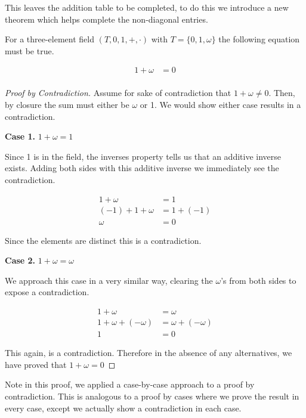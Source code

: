 \documentclass{report}
\newcommand{\header}[2]{\begin{flushright} \textbf{#1} #2 \end{flushright}}
\begin{document}
This leaves the addition table to be completed, to do this we introduce a new theorem which helps complete the non-diagonal entries.

\vspace{\baselineskip}
\begin{theorem}
	For a three-element field $(T, 0, 1, +, \cdot)$ with $T = \{ 0, 1, \omega \}$ the following equation must be true.
	
	\begin{align*}
		1 + \omega &= 0 \\
	\end{align*}
\end{theorem}

\begin{proof}[Proof by Contradiction]
	Assume for sake of contradiction that $1 + \omega \neq 0$. Then, by closure the sum must either be $\omega$ or 1. We would show either case results in a contradiction.
	
	\header{Case 1.}{$1 + \omega = 1$}
	
	Since 1 is in the field, the inverses property tells us that an additive inverse exists. Adding both sides with this additive inverse we immediately see the contradiction.
	
	\begin{align*}
		1 + \omega &= 1 \\
		(-1) + 1 + \omega &= 1 + (-1) \\
		\omega &= 0
	\end{align*}
	
	Since the elements are distinct this is a contradiction.

	\header{Case 2.}{$1 + \omega = \omega$}
	
	We approach this case in a very similar way, clearing the $\omega$'s from both sides to expose a contradiction.
	
	\begin{align*}
		1 + \omega &= \omega \\
		1 + \omega + (-\omega) &= \omega + (-\omega) \\
		1 &= 0
	\end{align*}
	
	This again, is a contradiction. Therefore in the absence of any alternatives, we have proved that $1 + \omega = 0$
\end{proof}
\vspace{\baselineskip}

Note in this proof, we applied a case-by-case approach to a proof by contradiction. This is analogous to a proof by cases where we prove the result in every case, except we actually show a contradiction in each case.
\end{document}
